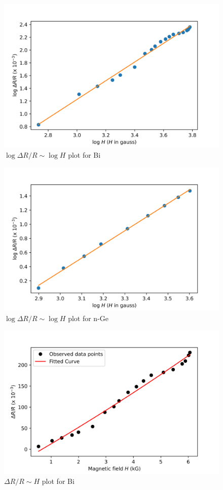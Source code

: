 \documentclass[%
 aip,
 amsmath,amssymb,
 reprint,%
]{revtex4-1}
\begin{document}
\begin{figure}
    \centering
    \includegraphics[scale = 0.56]{Figures/plot-mgrst-Bi-log.png}
    \caption{$\log \Delta R/R \sim \log H$ plot for Bi}
    \label{fig:logbi}
\end{figure}
\begin{figure}
    \centering
    \includegraphics[scale = 0.56]{Figures/plot-mgrst-Ge-log.png}
    \caption{$\log \Delta R/R \sim \log H$ plot for n-Ge}
    \label{fig:lognGe}
\end{figure}
\begin{figure}
    \centering
    \includegraphics[scale = 0.56]{Figures/plot-mgrst-Bi.png}
    \caption{$\Delta R/R \sim H$ plot for Bi}
    \label{fig:bimgst}
\end{figure}
\end{document}
